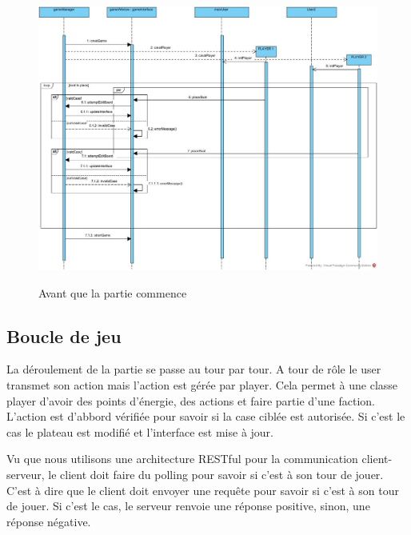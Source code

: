 \documentclass[../design_fonctionnement_sys.tex]{subfiles}
\begin{document}
\begin{figure}[H]
    \centering
    \includegraphics[scale=0.4]{img_design/PreGame.jpg}
    \label{fig:seq_match_server}
    \caption{Avant que la partie commence}
\end{figure}
\newpage

\subsection{Boucle de jeu}
La déroulement de la partie se passe au tour par tour. A tour de rôle le user transmet son action
mais l'action est gérée par player. Cela permet à une classe player d'avoir des points d'énergie, des actions et faire partie
d'une faction. L'action est d'abbord vérifiée pour savoir si la case ciblée est autorisée. Si c'est le cas le plateau
est modifié et l'interface est mise à jour.

Vu que nous utilisons une architecture RESTful pour la communication client-serveur, le client doit faire du polling pour savoir si c'est à son tour de jouer.
C'est à dire que le client doit envoyer une requête pour savoir si c'est à son tour de jouer. Si c'est le cas, le serveur renvoie une réponse positive, sinon, une réponse négative.
\end{document}
